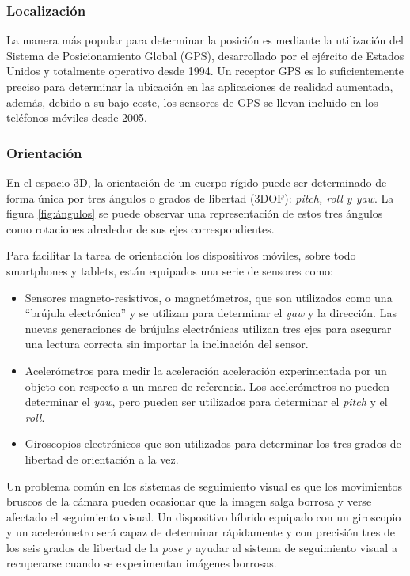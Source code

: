 \subsubsection{Localización}
La manera más popular para determinar la posición es mediante la utilización del Sistema de Posicionamiento Global (GPS), desarrollado por el ejército de Estados Unidos y totalmente operativo desde 1994. 
Un receptor GPS es lo suficientemente preciso para determinar la ubicación en las aplicaciones de realidad aumentada, además, debido a su bajo coste, los sensores de GPS se llevan incluido en los teléfonos móviles desde 2005.

\subsubsection{Orientación}
En el espacio 3D, la orientación de un cuerpo rígido puede ser determinado de forma única por tres ángulos o grados de libertad (3DOF): \emph{pitch, roll y yaw}. La figura \ref{fig:ángulos}  se puede observar una representación de estos tres ángulos como rotaciones alrededor de sus ejes correspondientes. 

Para facilitar la tarea de orientación los dispositivos móviles, sobre todo smartphones y tablets, están equipados una serie de sensores como:

\begin{itemize}
\item Sensores magneto-resistivos, o magnetómetros, que son utilizados como una ``brújula electrónica'' y se utilizan para determinar el \emph{yaw} y la dirección. Las nuevas generaciones de brújulas electrónicas utilizan tres ejes para asegurar una lectura correcta sin importar la inclinación del sensor.
\item Acelerómetros para medir la aceleración aceleración experimentada por un objeto con respecto a un marco de referencia. Los acelerómetros no pueden determinar el \emph{yaw}, pero pueden ser utilizados para determinar el \emph{pitch} y el \emph{roll}. 
\item Giroscopios electrónicos que son utilizados para determinar los tres grados de libertad de orientación a la vez.
\end{itemize}

Un problema común en los sistemas de seguimiento visual es que los movimientos bruscos de la cámara pueden ocasionar que la imagen salga borrosa y verse afectado el seguimiento visual. Un dispositivo híbrido equipado con un giroscopio y un acelerómetro será capaz de determinar rápidamente y con precisión tres de los seis grados de libertad de la \emph{pose} y ayudar al sistema de seguimiento visual a recuperarse cuando se experimentan imágenes borrosas. 

